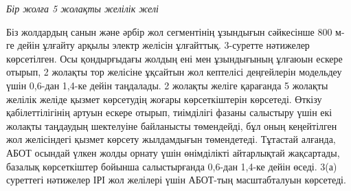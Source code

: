 \emph{Бір жолға 5 жолақты желілік желі}

Біз жолдардың санын және әрбір жол сегментінің ұзындығын сәйкесінше 800
м-ге дейін ұлғайту арқылы электр желісін ұлғайттық. 3-суретте нәтижелер
көрсетілген. Осы қондырғыдағы жолдың ені мен ұзындығының ұлғаюын ескере
отырып, 2 жолақты тор желісіне ұқсайтын жол кептелісі деңгейлерін
модельдеу үшін 0,6-дан 1,4-ке дейін таңдалады. 2 жолақты желіге
қарағанда 5 жолақты желілік желіде қызмет көрсетудің жоғары
көрсеткіштерін көрсетеді. Өткізу қабілеттілігінің артуын ескере отырып,
тиімділігі фазаны салыстыру үшін екі жолақты таңдаудың шектелуіне
байланысты төмендейді, бұл оның кеңейтілген жол желісіндегі қызмет
көрсету жылдамдығын төмендетеді. Тұтастай алғанда, АБОТ осындай үлкен
жолды орнату үшін өнімділікті айтарлықтай жақсартады, базалық
көрсеткіштер бойынша салыстырғанда 0,6-дан 1,4-ке дейін өседі. 3(а)
суреттегі нәтижелер ІРІ жол желілері үшін АБОТ-тың масштабталуын
көрсетеді.

